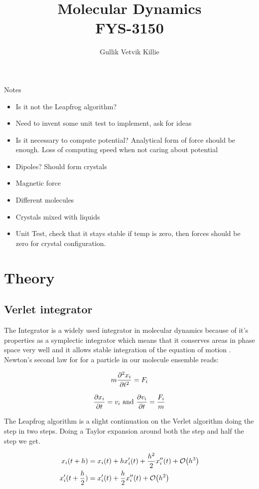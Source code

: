 \documentclass[11pt]{article}
\title{ Molecular Dynamics \\ FYS-3150 }
\author{Gullik Vetvik Killie }
\begin{document}
\maketitle

\tableofcontents

\newpage
Notes
\begin{itemize}
\item Is it not the Leapfrog algorithm?
\item Need to invent some unit test to implement, ask for ideas
\item Is it necessary to compute potential? Analytical form of force should be enough. Loss of computing speed when not caring about potential
\item Dipoles? Should form crystals
\item Magnetic force
\item Different molecules
\item Crystals mixed with liquids
\item Unit Test, check that it stays stable if temp is zero, then forces should be zero for crystal configuration.
\end{itemize}

\section{Theory}
	\subsection{Verlet integrator}
		The Integrator is a widely used integrator in  molecular dynamics \cite{compPhys} because of it's properties as a symplectic integrator which means that it conserves areas in phase space very well and it allows stable integration of the equation of motion \cite{aBInitio}. Newton's second law for for a particle in our molecule ensemble reads:

		\[m\pdv[2]{x_{i}}{t} = F_{i}\]

		\[\pdv{x_{i}}{t} = v_{i} \text{     and     } \pdv{v_{i}}{t} = \frac{F_{i}}{m} \]

		The Leapfrog algorithm is a slight continuation on the Verlet algorithm doing the step in two steps. Doing a Taylor expansion around both the step and half the step we get.
	

		\begin{align}
			x_{i}(t+h) &= x_i(t) + hx_i'(t) + \frac{h^2}{2}x_i''(t) + \order{h^3} \label{eq:leapfrog_start}
			\\
			x_i'(t+ \frac{h}{2} ) &= x_i'(t) + \frac{h}{2} x_i''(t) + \order{h^2} \label{eq:leapfrog_half}
		\end{align}	
\end{document}
